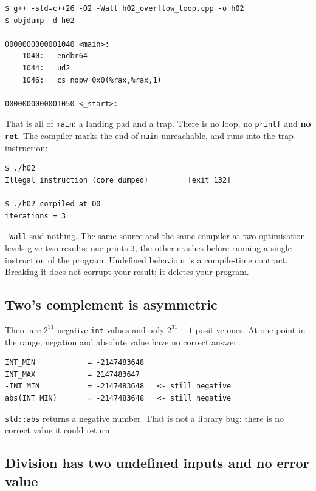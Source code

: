 \documentclass[11pt,a4paper]{article}
\newcommand{\code}[1]{\texttt{\small #1}}
\begin{document}
\begin{lstlisting}[style=term]
$ g++ -std=c++26 -O2 -Wall h02_overflow_loop.cpp -o h02
$ objdump -d h02

0000000000001040 <main>:
    1040:   endbr64
    1044:   ud2
    1046:   cs nopw 0x0(%rax,%rax,1)

0000000000001050 <_start>:
\end{lstlisting}

\noindent
That is all of \code{main}: a landing pad and a trap. There is no loop, no
\code{printf} and \textbf{no \code{ret}}. The compiler marks the end of
\code{main} unreachable, and runs into the trap instruction:

\begin{lstlisting}[style=term]
$ ./h02
Illegal instruction (core dumped)         [exit 132]

$ ./h02_compiled_at_O0
iterations = 3
\end{lstlisting}

\noindent
\code{-Wall} said nothing. The same source and the same compiler at two
optimisation levels give two results: one prints \code{3}, the other crashes
before running a single instruction of the program. Undefined behaviour is a
compile-time contract. Breaking it does not corrupt your result; it deletes
your program.

\subsection{Two's complement is asymmetric}

There are $2^{31}$ negative \code{int} values and only $2^{31}-1$ positive
ones. At one point in the range, negation and absolute value have no correct
answer.


\begin{lstlisting}[style=term]
INT_MIN            = -2147483648
INT_MAX            = 2147483647
-INT_MIN           = -2147483648   <- still negative
abs(INT_MIN)       = -2147483648   <- still negative
\end{lstlisting}

\noindent
\code{std::abs} returns a negative number. That is not a library bug: there
is no correct value it could return.

\subsection{Division has two undefined inputs and no error value}
\end{document}
